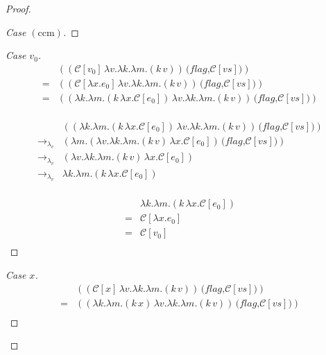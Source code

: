 \documentclass[ms,electronic,twosidetoc,letterpaper,chaptercenter,parttop]{byumsphd}
\begin{document}
\begin{proof}
\begin{proof}[Case $(\mathrm{ccm})$]
\end{proof}

\begin{proof}[Case $v_0$]
\begin{align*}
  &((\mathcal{C}[v_0]\,\lambda v.\lambda k.\lambda m.(k\,v))\,\textbf{(}\textit{flag}\textbf{,}\mathcal{C}[vs]\textbf{)})\\
= &((\mathcal{C}[\lambda x.e_0]\,\lambda v.\lambda k.\lambda m.(k\,v))\,\textbf{(}\textit{flag}\textbf{,}\mathcal{C}[vs]\textbf{)})\\
= &((\lambda k.\lambda m.(k\,\lambda x.\mathcal{C}[e_0])\,\lambda v.\lambda k.\lambda m.(k\,v))\,\textbf{(}\textit{flag}\textbf{,}\mathcal{C}[vs]\textbf{)})\\
\end{align*}

\begin{align*}
                        &((\lambda k.\lambda m.(k\,\lambda x.\mathcal{C}[e_0])\,\lambda v.\lambda k.\lambda m.(k\,v))\,\textbf{(}\textit{flag}\textbf{,}\mathcal{C}[vs]\textbf{)})\\
\rightarrow_{\lambda_v} &(\lambda m.(\lambda v.\lambda k.\lambda m.(k\,v)\,\lambda x.\mathcal{C}[e_0])\,\textbf{(}\textit{flag}\textbf{,}\mathcal{C}[vs]\textbf{)})\\
\rightarrow_{\lambda_v} &(\lambda v.\lambda k.\lambda m.(k\,v)\,\lambda x.\mathcal{C}[e_0])\\
\rightarrow_{\lambda_v} &\lambda k.\lambda m.(k\,\lambda x.\mathcal{C}[e_0])\\
\end{align*}

\begin{align*}
  &\lambda k.\lambda m.(k\,\lambda x.\mathcal{C}[e_0])\\
= &\mathcal{C}[\lambda x.e_0]\\
= &\mathcal{C}[v_0]\\
\end{align*}
\end{proof}

\begin{proof}[Case $x$]
\begin{align*}
  &((\mathcal{C}[x]\,\lambda v.\lambda k.\lambda m.(k\,v))\,\textbf{(}\textit{flag}\textbf{,}\mathcal{C}[vs]\textbf{)})\\
= &((\lambda k.\lambda m.(k\,x)\,\lambda v.\lambda k.\lambda m.(k\,v))\,\textbf{(}\textit{flag}\textbf{,}\mathcal{C}[vs]\textbf{)})\\
\end{align*}


\end{proof}
\end{proof}
\end{document}
